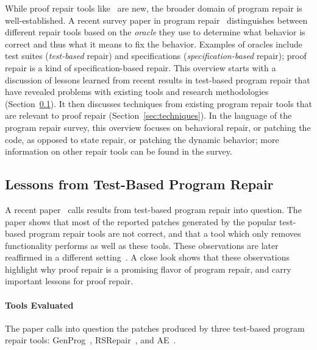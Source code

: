 While proof repair tools like \sysname\ are new, the broader domain of program repair is well-established.
A recent survey paper in program repair~\cite{Monperrus:2018:ASR:3177787.3105906} distinguishes between different repair tools
based on the \textit{oracle} they use to determine what behavior is correct and thus what it means to fix the behavior. 
Examples of oracles include test suites (\textit{test-based} repair) and specifications (\textit{specification-based} repair);
proof repair is a kind of specification-based repair.
This overview starts with a discussion of lessons learned from recent results in test-based program repair that have revealed
problems with existing tools and research methodologies (Section~\ref{sec:lessons}). It then discusses
techniques from existing program repair tools that are relevant to proof repair (Section~\ref{sec:techniques}). 
In the language of the program repair survey, %
this overview focuses on behavioral repair, or patching the code, as opposed to state repair, or patching the dynamic behavior;
more information on other repair tools %
can be found in the survey.

\subsection{Lessons from Test-Based Program Repair}
\label{sec:lessons}

A recent paper~\cite{Qi:2015:APP:2771783.2771791} calls results from test-based program repair into
question. The paper shows that most of the reported patches generated by the popular test-based program repair tools
are not correct, and that a tool which only removes functionality
performs as well %
as these tools. These observations %
are later reaffirmed in a different setting~\cite{DBLP:journals/corr/abs-1811-02429}.
A close look shows that these observations highlight why proof repair
is a promising flavor of program repair, and carry important lessons
for proof repair.

\paragraph{Tools Evaluated}
The paper calls into question
the patches produced by three test-based program repair tools:
GenProg~\cite{LeGoues:2012:SSA:2337223.2337225}, RSRepair~\cite{Qi:2014:SRS:2568225.2568254}, and AE~\cite{Weimer:2013:LPE:3107656.3107702}.

